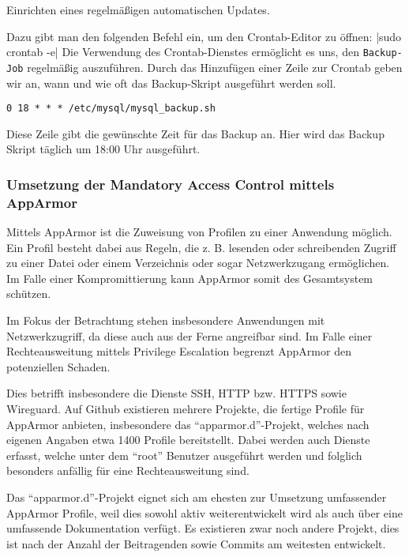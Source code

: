 Einrichten eines regelmäßigen automatischen Updates.

Dazu gibt man den folgenden Befehl ein, um den Crontab-Editor zu öffnen:
|sudo crontab -e|
Die Verwendung des Crontab-Dienstes ermöglicht es uns, den \verb+Backup-Job+ regelmäßig auszuführen. Durch das Hinzufügen einer Zeile zur Crontab geben wir an, wann und wie oft das Backup-Skript ausgeführt werden soll. 

\begin{verbatim}0 18 * * * /etc/mysql/mysql_backup.sh\end{verbatim}

Diese Zeile gibt die gewünschte Zeit für das Backup an. Hier wird das Backup Skript täglich um 18:00 Uhr ausgeführt.



\subsubsection{Umsetzung der Mandatory Access Control mittels AppArmor}

Mittels AppArmor ist die Zuweisung von Profilen zu einer Anwendung möglich. Ein Profil besteht dabei aus Regeln, die z. B. lesenden oder schreibenden Zugriff zu einer Datei oder einem Verzeichnis oder sogar Netzwerkzugang ermöglichen. Im Falle einer Kompromittierung kann AppArmor somit des Gesamtsystem schützen.

Im Fokus der Betrachtung stehen insbesondere Anwendungen mit Netzwerkzugriff, da diese auch aus der Ferne angreifbar sind. Im Falle einer Rechteausweitung mittels Privilege Escalation begrenzt AppArmor den potenziellen Schaden\cite{hutchinsIntelligenceDrivenComputerNetwork}.

Dies betrifft insbesondere die Dienste \ac{SSH}, \ac{HTTP} bzw. \ac{HTTPS} sowie Wireguard. Auf Github existieren mehrere Projekte, die fertige Profile für AppArmor anbieten, insbesondere das \enquote{apparmor.d}-Projekt, welches nach eigenen Angaben etwa 1400 Profile bereitstellt. Dabei werden auch Dienste erfasst, welche unter dem \enquote{root} Benutzer ausgeführt werden und folglich besonders anfällig für eine Rechteausweitung sind.

Das \enquote{apparmor.d}-Projekt eignet sich am ehesten zur Umsetzung umfassender AppArmor Profile, weil dies sowohl aktiv weiterentwickelt wird als auch über eine umfassende Dokumentation verfügt. Es existieren zwar noch andere Projekt, dies ist nach der Anzahl der Beitragenden sowie Commits am weitesten entwickelt.

